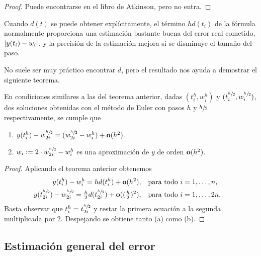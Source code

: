 \begin{proof}
    Puede encontrarse en el libro de Atkinson, pero no entra.
\end{proof}

\begin{remark}
    Cuando $d(t)$ se puede obtener explícitamente,
    el término $hd(t_i)$ de la fórmula normalmente proporciona
    una estimación bastante buena del error real cometido, $\abs{y(t_i) - w_i}$,
    y la precisión de la estimación mejora si se disminuye el tamaño del paso.
\end{remark}

No suele ser muy práctico encontrar $d$,
pero el resultado nos ayuda a demostrar el siguiente teorema.

\begin{theorem}
    \newcommand{\hh}{\sfrac{h}{2}}

    En condiciones similares a las del teorema anterior,
    dadas $(t_i^h, w_i^h)$ y $(t_i^{\hh}, w_i^{\hh})$,
    dos soluciones obtenidas con el método de Euler
    con pasos $h$ y $\hh$ respectivamente,
    se cumple que
    \begin{enumerate}[label=(\alph*)]
        \item $y(t_i^h) - w_{2i}^{\hh} = (w_{2i}^{\hh} - w_i^h) + \vo(h^2)$.
        \item $w_i := 2\cdot w_{2i}^{\hh} - w_i^h$
        es una aproximación de $y$ de orden $\vb{o}(h^2)$.
    \end{enumerate}
\end{theorem}

\begin{proof}
    \newcommand{\hh}{\sfrac{h}{2}}

    Aplicando el teorema anterior obtenemos
    \begin{align*}
        y(t_i^h) - w_i^h = hd(t_i^h) + \vo(h^2),
            & \qq{para todo $i = 1,\ldots,n$,} \\
        y(t_{2i}^{\hh}) - w_{2i}^{\hh} = \tfrac{h}{2}d(t_{2i}^{\hh})
            + \vo((\tfrac{h}{2})^2),
            & \qq{para todo $i = 1,\ldots,2n$.}
    \end{align*}
    Basta observar que $t_i^h = t_{2i}^{\hh}$
    y restar la primera ecuación a la segunda multiplicada por $2$.
    Despejando se obtiene tanto (a) como (b).
\end{proof}

\subsection{Estimación general del error}

